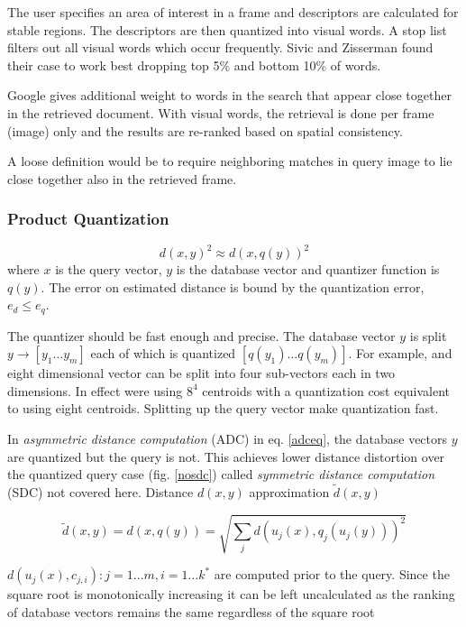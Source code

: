 \documentclass[english,12pt,a4paper,pdftex,elec,utf8, table]{aaltothesis}
\begin{document}
The user specifies an area of interest in a frame and descriptors are calculated for stable regions. The descriptors are then quantized into visual words. A stop list filters out all visual words which occur frequently. Sivic and Zisserman found their case to work best dropping top 5\% and bottom 10\% of words.

Google gives additional weight to words in the search that appear close together in the retrieved document. With visual words, the retrieval is done per frame (image) only and the results are re-ranked based on spatial consistency.

A loose definition would be to require neighboring matches in query image to lie close together also in the retrieved frame.

\subsubsection{Product Quantization} \label{PQ}
\begin{equation}
  \label{quantizereq}
d(x,y)^2 \approx d(x,q(y))^2
\end{equation}
where $x$ is the query vector, $y$ is the database vector and quantizer function is $q(y)$. The error on estimated distance is bound by the quantization error, $e_d \leq e_q$.  \cite{Jegou2014}

The quantizer should be fast enough and precise. The database vector $y$ is split $y \rightarrow [y_1 \ldots y_m]$ each of which is quantized $[q(y_1)\ldots q(y_m)]$. For example, and eight dimensional vector can be split into four sub-vectors each in two dimensions. In effect were using $8^4$ centroids with a quantization cost equivalent to using eight centroids. Splitting up the query vector make quantization fast. \cite{Jegou2014}

In \emph{asymmetric distance computation} (ADC) in eq. \ref{adceq}, the database vectors $y$ are quantized but the query is not. This achieves lower distance distortion over the quantized query case (fig. \ref{nosdc}) called \emph{symmetric distance computation} (SDC) not covered here. Distance $d(x,y)$ approximation $\tilde{d}(x,y)$

\begin{equation}
  \label{adceq}
  \tilde{d}(x,y)=d(x, q(y))=\sqrt{\sum_jd(u_j(x),q_j(u_j(y)))^2}
\end{equation}

$d(u_j(x),c_{j,i}) : j = 1\ldots m,i=1\ldots k^*$ are computed prior to the query. Since the square root is monotonically increasing it can be left uncalculated as the ranking of database vectors remains the same regardless of the square root\cite{Jegou2011}
\end{document}
